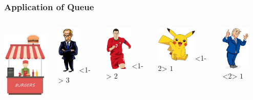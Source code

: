 \begin{frame}
\frametitle{Application of Queue}

\begin{columns}
    \includegraphics[height=3.8cm]{Image/Burger_Stall.jpg}
  \begin{center}
    \includegraphics[height=2.3cm]{Image/putin.jpg}<1->
    $3$
  \end{center}

    \begin{center}
      \includegraphics[height=2.1cm]{Image/ronaldo.png}<1->
      $2$
    \end{center}

  \begin{center}
    \includegraphics[height=1.7cm]{Image/pikachu.jpg}<1-2>
    $1$
  \end{center}

  \begin{center}
    \includegraphics[height=2.1cm]{Image/trump.jpg}<2>
    $1$
  \end{center}

  \end{columns}

\end{frame}

